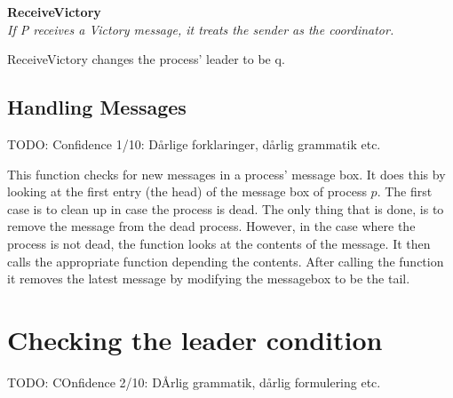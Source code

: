 \documentclass{report}
\begin{document}
\textbf{ReceiveVictory}\\
\textit{If P receives a Victory message, it treats the sender as the coordinator.}

ReceiveVictory changes the process' leader to be q.


\subsection{Handling Messages}
\begin{callout}
TODO: Confidence 1/10: Dårlige forklaringer, dårlig grammatik etc.
\end{callout}

\noindent{}

This function checks for new messages in a process' message box. It does this by looking at the first entry (the head) of the message box of process $p$. The first case is to clean up in case the process is dead. The only thing that is done, is to remove the message from the dead process. However, in the case where the process is not dead, the function looks at the contents of the message. It then calls the appropriate function depending the contents. After calling the function it removes the latest message by modifying the messagebox to be the tail.

\section{Checking the leader condition}
TODO: COnfidence 2/10: DÅrlig grammatik, dårlig formulering etc.\\
\noindent{}
\end{document}
